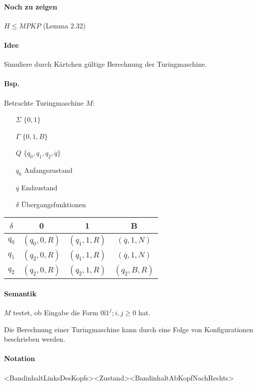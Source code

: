 \paragraph*{Noch zu zeigen} $H \leq MPKP$ (Lemma 2.32)

\paragraph*{Idee} Simuliere durch Kärtchen gültige Berechnung der Turingmaschine.

\paragraph*{Bsp.} Betrachte Turingmaschine $M$:
\begin{itemize}
	\item[$\Sigma$] $\{ 0,1 \}$
	\item[$\Gamma$] $\{ 0,1,B \}$
	\item[$Q$] $\{ q_0,q_1,q_2,\overline{q} \}$
	\item[$q_0$] Anfangszustand
	\item[$\overline{q}$] Endzustand
	\item[$\delta$] Übergangsfunktionen
\end{itemize}

\begin{table}[htb!] %
\centering
\begin{tabular}{c|c c c}
$\delta$ & 0 & 1 & B \\
\hline
$q_0$ & $(q_0,0,R)$ & $(q_1,1,R)$ & $(\overline{q},1,N)$ \\
$q_1$ & $(q_2,0,R)$ & $(q_1,1,R)$ & $(\overline{q},1,N)$ \\
$q_2$ & $(q_2,0,R)$ & $(q_2,1,R)$ & $(q_2,B,R)$ \\
\end{tabular}
\end{table}

\paragraph*{Semantik} $M$ testet, ob Eingabe die Form $0î1^j;i,j \geq 0$ hat.

\par\medskip Die Berechnung einer Turingmaschine kann durch eine Folge von Konfigurationen beschrieben werden.

\paragraph*{Notation} <BandinhaltLinksDesKopfs><Zustand><BandinhaltAbKopfNachRechts>

